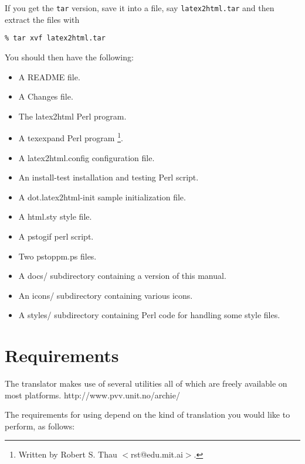 If you get the {\tt tar} version, save it into a file, say {\tt latex2html.tar}
and then extract the files with 
\begin{verbatim}
% tar xvf latex2html.tar
\end{verbatim} 

You should then have the following:
\begin{itemize}
\item A {\fn README} file.
\item A {\fn Changes} file.
\item The {\fn latex2html} Perl program.
\item A  {\fn texexpand} Perl program \footnote{Written 
by Robert S. Thau $<$rst@edu.mit.ai$>$.}.
\item A {\fn latex2html.config} configuration file.
\item An {\fn install-test} installation and testing Perl script.
\item A {\fn dot.latex2html-init} sample initialization file.
\item A {\fn html.sty} style file.
\item A {\fn pstogif} perl script.
\item Two {\fn pstoppm.ps} files.
\item A {\fn docs/} subdirectory containing a version of this
manual.
\item An {\fn icons/} subdirectory containing various icons.
\item A {\fn styles/} subdirectory containing Perl code for handling
some style files.
\end{itemize}
\section{Requirements}
The translator makes use of several utilities all of which 
are freely available on most platforms. 
{http://www.pvv.unit.no/archie/}

The requirements for using \latextohtml 
depend on the kind of translation you would like to perform, as follows:


